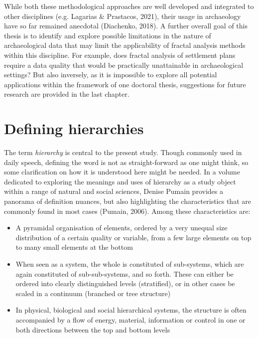 \documentclass[
  12pt,
]{book}
\begin{document}
While both these methodological approaches are well developed and integrated to other disciplines (e.g. Lagarias \& Prastacos, 2021), their usage in archaeology have so far remained anecdotal (Diachenko, 2018). A further overall goal of this thesis is to identify and explore possible limitations in the nature of archaeological data that may limit the applicability of fractal analysis methods within this discipline. For example, does fractal analysis of settlement plans require a data quality that would be practically unattainable in archaeological settings? But also inversely, as it is impossible to explore all potential applications within the framework of one doctoral thesis, suggestions for future research are provided in the last chapter.

\hypertarget{defining-hierarchies}{%
\section{Defining hierarchies}\label{defining-hierarchies}}

The term \emph{hierarchy} is central to the present study. Though commonly used in daily speech, defining the word is not as straight-forward as one might think, so some clarification on how it is understood here might be needed. In a volume dedicated to exploring the meanings and uses of hierarchy as a study object within a range of natural and social sciences, Denise Pumain provides a panorama of definition nuances, but also highlighting the characteristics that are commonly found in most cases (Pumain, 2006). Among these characteristics are:

\begin{itemize}
\item
  A pyramidal organisation of elements, ordered by a very unequal size distribution of a certain quality or variable, from a few large elements on top to many small elements at the bottom
\item
  When seen as a system, the whole is constituted of sub-systems, which are again constituted of sub-sub-systems, and so forth. These can either be ordered into clearly distinguished levels (stratified), or in other cases be scaled in a continuum (branched or tree structure)
\item
  In physical, biological and social hierarchical systems, the structure is often accompanied by a flow of energy, material, information or control in one or both directions between the top and bottom levels
\end{itemize}
\end{document}
